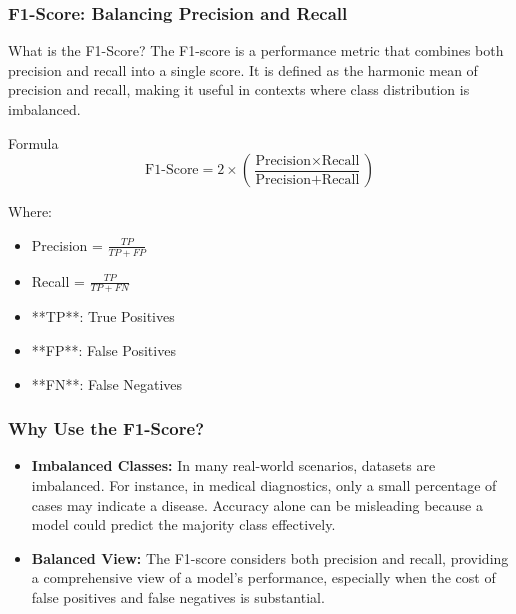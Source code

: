 \documentclass[aspectratio=169]{beamer}
\begin{document}
\begin{frame}[fragile]
    \frametitle{F1-Score: Balancing Precision and Recall}
    \begin{block}{What is the F1-Score?}
        The F1-score is a performance metric that combines both precision and recall into a single score. 
        It is defined as the harmonic mean of precision and recall, making it useful in contexts where class distribution is imbalanced.
    \end{block}
    
    \begin{block}{Formula}
        \begin{equation}
            \text{F1-Score} = 2 \times \left( \frac{\text{Precision} \times \text{Recall}}{\text{Precision} + \text{Recall}} \right)
        \end{equation}
        
        Where:
        \begin{itemize}
            \item Precision = \( \frac{TP}{TP + FP} \)
            \item Recall = \( \frac{TP}{TP + FN} \)
            \item **TP**: True Positives 
            \item **FP**: False Positives  
            \item **FN**: False Negatives  
        \end{itemize}
    \end{block}
\end{frame}

\begin{frame}[fragile]
    \frametitle{Why Use the F1-Score?}
    \begin{itemize}
        \item \textbf{Imbalanced Classes:} In many real-world scenarios, datasets are imbalanced. For instance, in medical diagnostics, only a small percentage of cases may indicate a disease. Accuracy alone can be misleading because a model could predict the majority class effectively.
        
        \item \textbf{Balanced View:} The F1-score considers both precision and recall, providing a comprehensive view of a model's performance, especially when the cost of false positives and false negatives is substantial.
    \end{itemize}
\end{frame}
\end{document}
